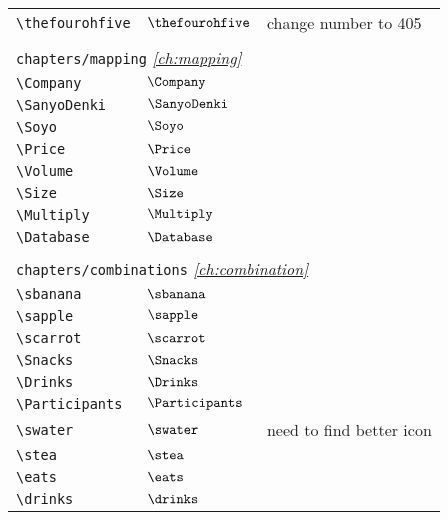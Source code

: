 \begin{longtable}{lll}
 {\color[rgb]{0.5,0.5,0.5}\texttt{\textbackslash thefourohfive}} & $\thefourohfive$ &  change number to 405\\ 
  &  & \\ 
 \multicolumn{3}{l}{{\color[rgb]{0.5,0.5,0.5}\texttt{chapters/mapping}} \emph{\cref{ch:mapping}}}\\ 
 \hline
{\color[rgb]{0.5,0.5,0.5}\texttt{\textbackslash Company}} & $\Company$ & \\ 
 {\color[rgb]{0.5,0.5,0.5}\texttt{\textbackslash SanyoDenki}} & $\SanyoDenki$ & \\ 
 {\color[rgb]{0.5,0.5,0.5}\texttt{\textbackslash Soyo}} & $\Soyo$ & \\ 
 {\color[rgb]{0.5,0.5,0.5}\texttt{\textbackslash Price}} & $\Price$ & \\ 
 {\color[rgb]{0.5,0.5,0.5}\texttt{\textbackslash Volume}} & $\Volume$ & \\ 
 {\color[rgb]{0.5,0.5,0.5}\texttt{\textbackslash Size}} & $\Size$ & \\ 
 {\color[rgb]{0.5,0.5,0.5}\texttt{\textbackslash Multiply}} & $\Multiply$ & \\ 
 {\color[rgb]{0.5,0.5,0.5}\texttt{\textbackslash Database}} & $\Database$ & \\ 
  &  & \\ 
 \multicolumn{3}{l}{{\color[rgb]{0.5,0.5,0.5}\texttt{chapters/combinations}} \emph{\cref{ch:combination}}}\\ 
 \hline
{\color[rgb]{0.5,0.5,0.5}\texttt{\textbackslash sbanana}} & $\sbanana$ & \\ 
 {\color[rgb]{0.5,0.5,0.5}\texttt{\textbackslash sapple}} & $\sapple$ & \\ 
 {\color[rgb]{0.5,0.5,0.5}\texttt{\textbackslash scarrot}} & $\scarrot$ & \\ 
 {\color[rgb]{0.5,0.5,0.5}\texttt{\textbackslash Snacks}} & $\Snacks$ & \\ 
 {\color[rgb]{0.5,0.5,0.5}\texttt{\textbackslash Drinks}} & $\Drinks$ & \\ 
 {\color[rgb]{0.5,0.5,0.5}\texttt{\textbackslash Participants}} & $\Participants$ & \\ 
 {\color[rgb]{0.5,0.5,0.5}\texttt{\textbackslash swater}} & $\swater$ &  need to find better icon\\ 
 {\color[rgb]{0.5,0.5,0.5}\texttt{\textbackslash stea}} & $\stea$ & \\ 
 {\color[rgb]{0.5,0.5,0.5}\texttt{\textbackslash eats}} & $\eats$ & \\ 
 {\color[rgb]{0.5,0.5,0.5}\texttt{\textbackslash drinks}} & $\drinks$ & \\ 

\end{longtable}
